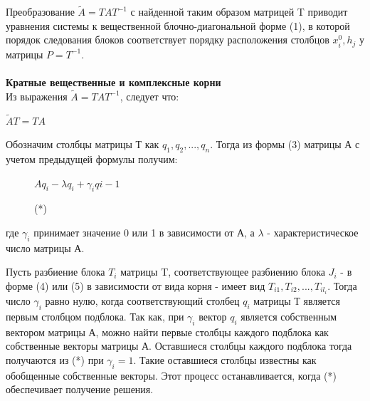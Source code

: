 \documentclass[12pt,a4paper,oneside]{article}
\begin{document}
Преобразование $\widetilde{A}=TAT^{-1}$ с найденной таким образом матрицей T приводит уравнения системы к вещественной блочно-диагональной форме (1), в которой порядок следования блоков соответствует порядку расположения столбцов $x^0_i, h_j$ у матрицы $P=T^{-1}$.\\\\
\textbf{Кратные вещественные и комплексные корни}\\
Из выражения $\widetilde{A}=TAT^{-1}$, следует что:
\begin{center}
	$\widetilde{A}T=TA$
\end{center}
Обозначим столбцы матрицы Т как $q_1, q_2, ..., q_n$. Тогда из формы (3) матрицы А с учетом предыдущей формулы получим:
\begin{figure}[H]
	\centering
	\begin{minipage}{.2\textwidth}
		\centering
		$Aq_i-\lambda q_i+\gamma_iq{i-1}$
	\end{minipage}%
	\begin{minipage}{.2\textwidth}
		\centering
		(*)
	\end{minipage}
\end{figure}
где $\gamma_i$ принимает значение 0 или 1 в зависимости от А, а $\lambda$ - характеристическое число матрицы А.

Пусть разбиение блока $T_i$ матрицы T, соответствующее разбиению блока $J_i$ - в форме (4) или (5) в зависимости от вида корня - имеет вид $T_{i1}, T_{i2}, ..., T_{il_i}$. Тогда число $\gamma_i$ равно нулю, когда соответствующий столбец $q_i$ матрицы Т является первым столбцом подблока. Так как, при $\gamma_i$ вектор $q_i$ является собственным вектором матрицы А, можно найти первые столбцы каждого подблока как собственные векторы матрицы А. Оставшиеся столбцы каждого подблока тогда получаются из (*) при $\gamma_i=1$. Такие оставшиеся столбцы известны как обобщенные собственные векторы. Этот процесс останавливается, когда (*) обеспечивает получение решения.
\end{document}
